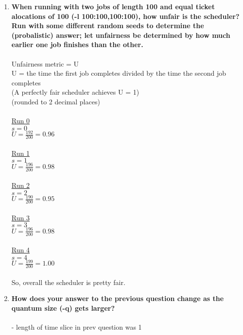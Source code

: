 \documentclass{article}
\begin{document}
\begin{enumerate}
    \item \textbf{When running with two jobs of length 100 and equal ticket alocations of 100 (-l 100:100,100:100), how unfair is the scheduler? Run with some different random seeds to determine the (probalistic) answer; let unfairness be determined by how much earlier one job finishes than the other.} \\\\
    
    Unfairness metric = U \\
    U = the time the first job completes divided by the time the second job completes\\
    (A perfectly fair scheduler achieves U = 1)\\

    (rounded to 2 decimal places)\\\\
    \underline{Run 0}\\
    $s = 0$ \\
    $U = \frac{192}{200} = 0.96$\\\\
    \underline{Run 1}\\
    $s = 1$\\
    $U = \frac{196}{200} = 0.98$\\\\
    \underline{Run 2}\\
    $s = 2$\\
    $U = \frac{190}{200} = 0.95$\\\\
    \underline{Run 3} \\
    $s = 3$\\
    $U = \frac{196}{200} = 0.98$\\\\
    \underline{Run 4}\\
    $s = 4$\\
    $U = \frac{199}{200} = 1.00$\\\\

    So, overall the scheduler is pretty fair.

    \item \textbf{How does your answer to the previous question change as the quantum size (-q) gets larger?}\\\\
    
    - length of time slice in prev question was 1\\\\


\end{enumerate}
\end{document}
